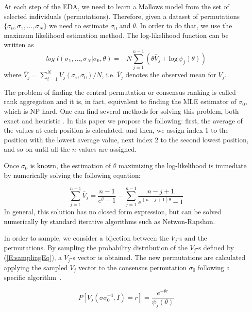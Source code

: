 \documentclass[runningheads]{llncs}
\begin{document}
At each step of the EDA, we need to learn a Mallows model from the set of selected individuals (permutations). Therefore, given a dataset of permutations $\{\sigma_0,\sigma_1,\ldots,\sigma_N\}$ we need to estimate $\sigma_0$ and $\theta$. In order to do that, we use the maximum likelihood estimation method. The log-likelihood function can be written as 
\begin{equation} 
log \,\,l ( \sigma_1, ..., \sigma_N | \sigma_0,\theta)= - N \sum_{j=1}^{n-1}(\theta \bar{V}_j + \text{log}\, \psi_j (\theta))
\end{equation}
\noindent
where $\bar{V}_j= \sum_{i=1}^{N}V_j(\sigma_i, \sigma_0)/N$, i.e. $\bar{V}_j$ denotes the observed mean for $V_j$. 

The problem of finding the central permutation or consensus ranking is called rank aggregation and it is, in fact, equivalent to finding the MLE estimator of $\sigma_0$, which is NP-hard. One can find several methods for solving this problem, both exact \cite{cohen10} and heuristic \cite{meilaTractable}.
In this paper we propose the following: first, the average of the values at each position is calculated, and then, we assign index $1$ to the position with the lowest average value, next index 2 to the second lowest position, and so on until all the $n$ values are assigned.

Once $\sigma_0$ is known, the estimation of $\theta$ maximizing the log-likelihood  is immediate by numerically solving the following equation:

\begin{equation}
	\sum_{j=1}^{n-1}\bar{V}_j= \frac{n-1}{e^{\theta}-1}-\sum_{j=1}^{n-1}\frac{n-j+1}{e^{(n-j+1)\theta}-1}
	\label{E:thetas}
\end{equation}
%
In general, this solution has no closed form expression, but can be solved numerically by standard iterative algorithms such as Netwon-Rapshon.

In order to sample, we consider a bijection between the $V_j$-s and the permutations. By sampling the probability distribution of the $V_j$-s defined by (\ref{E:samplingEq}), a $V_j$-s vector is obtained. The new permutations are calculated applying the sampled $V_j$ vector to the consensus permutation $\sigma_0$ following a specific algorithm~\cite{meila2007-conrank}. 

\begin{equation}P[V_j(\sigma\sigma_0^{-1},I)=r]=\frac{e^{-\theta r}}{\psi_j(\theta)}\label{E:samplingEq}\end{equation}
\end{document}
